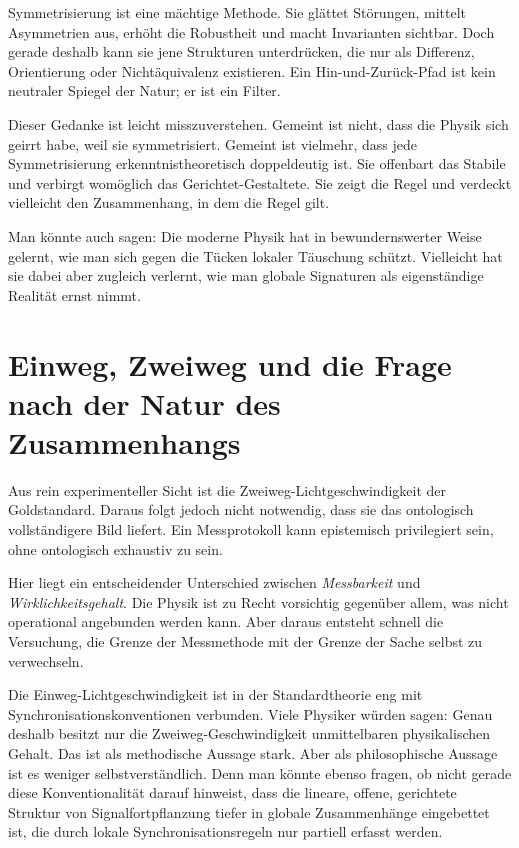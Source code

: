 \documentclass[11pt,a4paper]{article}
\theoremstyle{remark}
\begin{document}
	Symmetrisierung ist eine mächtige Methode. Sie glättet Störungen, mittelt Asymmetrien aus, erhöht die Robustheit und macht Invarianten sichtbar. Doch gerade deshalb kann sie jene Strukturen unterdrücken, die nur als Differenz, Orientierung oder Nichtäquivalenz existieren. Ein Hin-und-Zurück-Pfad ist kein neutraler Spiegel der Natur; er ist ein Filter.
	
	Dieser Gedanke ist leicht misszuverstehen. Gemeint ist nicht, dass die Physik sich geirrt habe, weil sie symmetrisiert. Gemeint ist vielmehr, dass jede Symmetrisierung erkenntnistheoretisch doppeldeutig ist. Sie offenbart das Stabile und verbirgt womöglich das Gerichtet-Gestaltete. Sie zeigt die Regel und verdeckt vielleicht den Zusammenhang, in dem die Regel gilt.
	
	Man könnte auch sagen: Die moderne Physik hat in bewundernswerter Weise gelernt, wie man sich gegen die Tücken lokaler Täuschung schützt. Vielleicht hat sie dabei aber zugleich verlernt, wie man globale Signaturen als eigenständige Realität ernst nimmt.
	
	\section{Einweg, Zweiweg und die Frage nach der Natur des Zusammenhangs}
	
	Aus rein experimenteller Sicht ist die Zweiweg-Lichtgeschwindigkeit der Goldstandard. Daraus folgt jedoch nicht notwendig, dass sie das ontologisch vollständigere Bild liefert. Ein Messprotokoll kann epistemisch privilegiert sein, ohne ontologisch exhaustiv zu sein.
	
	Hier liegt ein entscheidender Unterschied zwischen \emph{Messbarkeit} und \emph{Wirklichkeitsgehalt}. Die Physik ist zu Recht vorsichtig gegenüber allem, was nicht operational angebunden werden kann. Aber daraus entsteht schnell die Versuchung, die Grenze der Messmethode mit der Grenze der Sache selbst zu verwechseln.
	
	Die Einweg-Lichtgeschwindigkeit ist in der Standardtheorie eng mit Synchronisationskonventionen verbunden. Viele Physiker würden sagen: Genau deshalb besitzt nur die Zweiweg-Geschwindigkeit unmittelbaren physikalischen Gehalt. Das ist als methodische Aussage stark. Aber als philosophische Aussage ist es weniger selbstverständlich. Denn man könnte ebenso fragen, ob nicht gerade diese Konventionalität darauf hinweist, dass die lineare, offene, gerichtete Struktur von Signalfortpflanzung tiefer in globale Zusammenhänge eingebettet ist, die durch lokale Synchronisationsregeln nur partiell erfasst werden.
	
\end{document}
